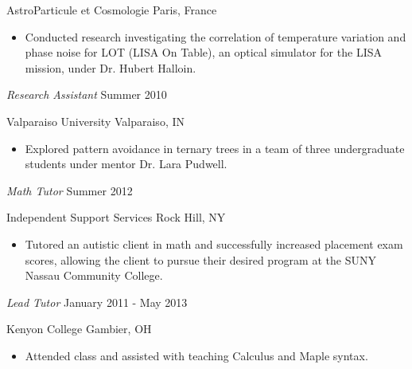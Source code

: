 \documentclass[11pt,article,oneside]{memoir}
\begin{document}
\ind AstroParticule et Cosmologie \hfill {\small Paris, France}
\small
\begin{itemize}
  \item Conducted research investigating the correlation of temperature
    variation and phase noise for LOT (LISA On Table), an optical simulator for
    the LISA mission, under Dr. Hubert Halloin.
\end{itemize}
\normalsize

\ind \emph{Research Assistant} \hfill {\small Summer 2010}

\ind Valparaiso University \hfill {\small Valparaiso, IN}
\small
\begin{itemize}
  \item Explored pattern avoidance in ternary trees in a team of three
    undergraduate students under mentor Dr. Lara Pudwell.
\end{itemize}
\normalsize

\bigskip





\ind \emph{Math Tutor} \hfill {\small Summer 2012}

\ind Independent Support Services \hfill {\small Rock Hill, NY}
\small
\begin{itemize}
  \item Tutored an autistic client in math and successfully increased placement
    exam scores, allowing the client to pursue their desired program at the
    SUNY Nassau Community College.
\end{itemize}
\normalsize

\ind \emph{Lead Tutor} \hfill {\small January 2011 - May 2013}

\ind Kenyon College \hfill {\small Gambier, OH}
\small
\begin{itemize}
  \item Attended class and assisted with teaching Calculus and Maple syntax.
\end{itemize}
\normalsize

\bigskip
\end{document}
